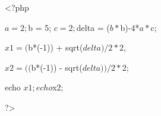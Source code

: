 <?php

$a = 2;
$b = 5;
$c = 2;

$delta = ($b*$b)-4*$a*$c;


$x1 = ($b*(-1)) + sqrt($delta) /2*$2,





$x2 = (($b*(-1)) - sqrt($delta)) /2*$2;


echo $x1;
echo $x2;

?>